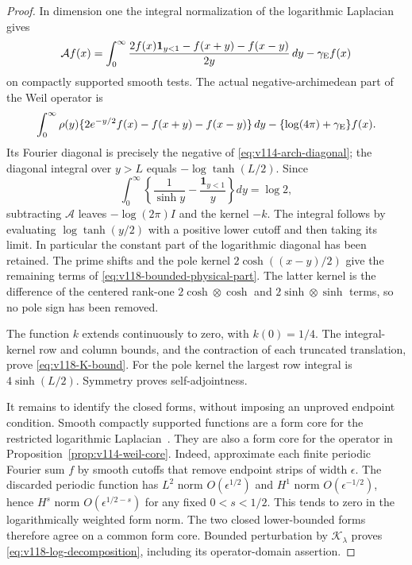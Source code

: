 \documentclass[11pt]{article}
\theoremstyle{remark}
\begin{document}
\begin{proof}
In dimension one the integral normalization of the logarithmic
Laplacian~\cite[Theorem~1.1]{ChenWethLog} gives
\[
 \mathcal A f(x)=\int_0^\infty
 \frac{2f(x)\mathbf1_{y<1}-f(x+y)-f(x-y)}{2y}\,dy
                   -\gamma_{\rm E}f(x)
\]
on compactly supported smooth tests.  The actual negative-archimedean
part of the Weil operator is
\[
 \int_0^\infty\rho(y)
 \{2e^{-y/2}f(x)-f(x+y)-f(x-y)\}\,dy
             -\{\log(4\pi)+\gamma_{\rm E}\}f(x).
\]
Its Fourier diagonal is precisely the negative of
\eqref{eq:v114-arch-diagonal}; the diagonal integral over $y>L$
equals $-\log\tanh(L/2)$.  Since
\[
 \int_0^\infty\left\{\frac1{\sinh y}
                -\frac{\mathbf1_{y<1}}y\right\}dy=\log2,
\]
subtracting $\mathcal A$ leaves $-\log(2\pi)I$ and the kernel $-k$.
The integral follows by evaluating $\log\tanh(y/2)$ with a positive
lower cutoff and then taking its limit.  In particular the constant
part of the logarithmic diagonal has been retained.
The prime shifts and the pole kernel $2\cosh((x-y)/2)$ give the
remaining terms of \eqref{eq:v118-bounded-physical-part}.
The latter kernel is the difference of the centered rank-one
$2\cosh\otimes\cosh$ and $2\sinh\otimes\sinh$ terms, so no pole
sign has been removed.

The function $k$ extends continuously to zero, with $k(0)=1/4$.
The integral-kernel row and column bounds, and the contraction of
each truncated translation, prove \eqref{eq:v118-K-bound}.
For the pole kernel the largest row integral is
$4\sinh(L/2)$.  Symmetry proves self-adjointness.

It remains to identify the closed forms, without imposing an
unproved endpoint condition.  Smooth compactly supported functions
are a form core for the restricted logarithmic
Laplacian~\cite[Theorem~3.1]{ChenWethLog}.  They are also a form core
for the operator in Proposition~\ref{prop:v114-weil-core}.
Indeed, approximate each finite periodic Fourier sum $f$ by smooth
cutoffs that remove endpoint strips of width $\epsilon$.
The discarded periodic function has $L^2$ norm $O(\epsilon^{1/2})$
and $H^1$ norm $O(\epsilon^{-1/2})$, hence $H^s$ norm
$O(\epsilon^{1/2-s})$ for any fixed $0<s<1/2$.
This tends to zero in the logarithmically weighted form norm.
The two closed lower-bounded forms therefore agree on a common form
core.  Bounded perturbation by $\mathcal K_\lambda$ proves
\eqref{eq:v118-log-decomposition}, including its operator-domain assertion.
\end{proof}
\end{document}
